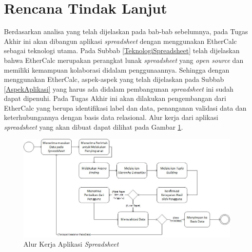 \section{Rencana Tindak Lanjut}
Berdasarkan analisa yang telah dijelaskan pada bab-bab sebelumnya, pada Tugas Akhir ini akan dibangun aplikasi \textit{spreadsheet} dengan menggunakan EtherCalc sebagai teknologi utama. Pada Subbab \ref{TeknologiSpreadsheet} telah dijelaskan bahwa EtherCalc merupakan perangkat lunak \textit{spreadsheet} yang \textit{open source} dan memiliki kemampuan kolaborasi didalam penggunaannya. Sehingga dengan menggunakan EtherCalc, aspek-aspek yang telah dijelaskan pada Subbab \ref{AspekAplikasi} yang harus ada didalam pembangunan \textit{spreadsheet} ini sudah dapat dipenuhi. Pada Tugas Akhir ini akan dilakukan pengembangan dari EtherCalc yang berupa identifikasi label dan data, penanganan validasi data dan keterhubungannya dengan basis data relasional. Alur kerja dari aplikasi \textit{spreadsheet} yang akan dibuat dapat dilihat pada Gambar \ref{GambarWorkflow}. 

	\begin{figure}[htb]
	    \centering
	    \includegraphics[width=1\textwidth]{resources/chapter-3-workflow.jpg}
	    \caption{Alur Kerja Aplikasi \textit{Spreadsheet}}
		\label{GambarWorkflow}
	\end{figure}
